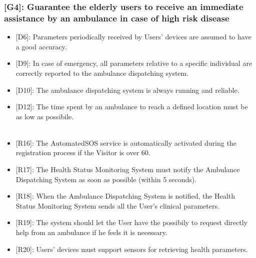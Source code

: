 \documentclass[12pt,a4paper]{article}
\begin{document}
		\subsubsection*{{[}{G4}{]}: Guarantee the elderly users to receive an immediate assistance by an ambulance in case of high risk disease}
			\begin{itemize}
				\begin{itemize}
					\item {[D6]}: Parameters periodically received by Users' devices are assumed to have a good accuracy. 
					\item {[D9]}: In case of emergency, all parameters relative to a specific individual are correctly reported to the ambulance dispatching system.
					\item {[D10]}: The ambulance dispatching system is always running and reliable.
					\item {[D12]}: The time spent by an ambulance to reach a defined location must be as low as possibile. 
					\\ \\
					\item {[R16]}: The AutomatedSOS service is automatically activated during the registration process if the Visitor is over 60.
					\item {[R17]}: The Health Status Monitoring System must notify the Ambulance Dispatching System as soon as possible (within 5 seconds).
					\item {[R18]}: When the Ambulance Dispatching System is notified, the Health Status Monitoring System sends all the User's clinical parameters.
					\item {[R19]}: The system should let the User have the possibily to request directly help from an ambulance if he feels it is necessary.
					\item {[R20]}: Users' devices must support sensors for retrieving health parameters.
				\end{itemize}
			\end{itemize}
\end{document}
